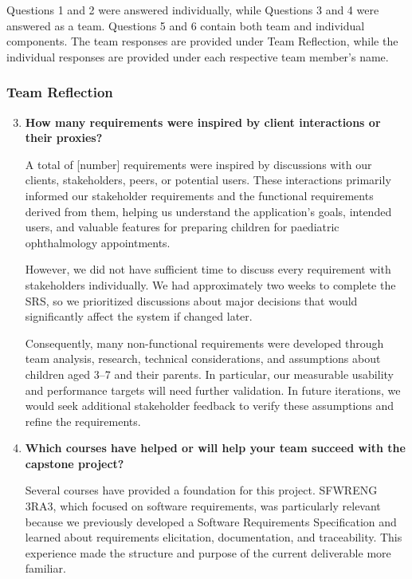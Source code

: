 \documentclass[12pt]{article}
\begin{document}
Questions 1 and 2 were answered individually, while Questions 3 and 4 were
answered as a team. Questions 5 and 6 contain both team and individual
components. The team responses are provided under Team Reflection, while the
individual responses are provided under each respective team member's name.

\subsubsection*{Team Reflection}

\begin{enumerate}
    \setcounter{enumi}{2}

    \item \textbf{How many requirements were inspired by client interactions
    or their proxies?}

    A total of [number] requirements were inspired by discussions with our
    clients, stakeholders, peers, or potential users. These interactions
    primarily informed our stakeholder requirements and the functional
    requirements derived from them, helping us understand the application's
    goals, intended users, and valuable features for preparing children
    for paediatric ophthalmology appointments.

    However, we did not have sufficient time to discuss every requirement
    with stakeholders individually. We had approximately two weeks to
    complete the SRS, so we prioritized discussions about major decisions
    that would significantly affect the system if changed later.

    Consequently, many non-functional requirements were developed through
    team analysis, research, technical considerations, and assumptions
    about children aged 3--7 and their parents. In particular, our measurable
    usability and performance targets will need further validation.
    In future iterations, we would seek additional stakeholder feedback
    to verify these assumptions and refine the requirements.

    \item \textbf{Which courses have helped or will help your team
    succeed with the capstone project?}

    Several courses have provided a foundation for this project.
    SFWRENG 3RA3, which focused on software requirements, was particularly
    relevant because we previously developed a Software Requirements
    Specification and learned about requirements elicitation, documentation,
    and traceability. This experience made the structure and purpose of
    the current deliverable more familiar.


\end{enumerate}
\end{document}

